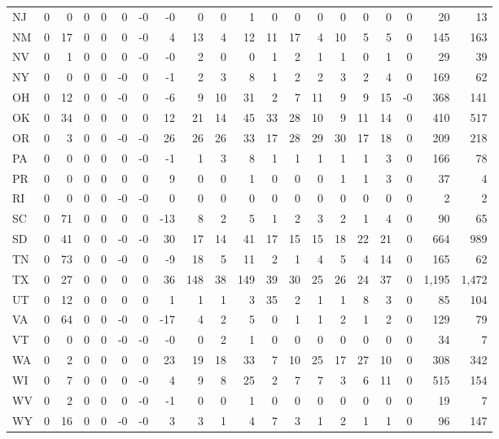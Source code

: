 \begin{longtable}{lrrrrrrrrrrrrrrrrrrr}
NJ & 0 & 0 & 0 & 0 & 0 & -0 & -0 & 0 & 0 & 1 & 0 & 0 & 0 & 0 & 0 & 0 & 0 & 20 & 13 \\
NM & 0 & 17 & 0 & 0 & 0 & -0 & 4 & 13 & 4 & 12 & 11 & 17 & 4 & 10 & 5 & 5 & 0 & 145 & 163 \\
NV & 0 & 1 & 0 & 0 & 0 & -0 & -0 & 2 & 0 & 0 & 1 & 2 & 1 & 1 & 0 & 1 & 0 & 29 & 39 \\
NY & 0 & 0 & 0 & 0 & -0 & 0 & -1 & 2 & 3 & 8 & 1 & 2 & 2 & 3 & 2 & 4 & 0 & 169 & 62 \\
OH & 0 & 12 & 0 & 0 & -0 & 0 & -6 & 9 & 10 & 31 & 2 & 7 & 11 & 9 & 9 & 15 & -0 & 368 & 141 \\
OK & 0 & 34 & 0 & 0 & 0 & 0 & 12 & 21 & 14 & 45 & 33 & 28 & 10 & 9 & 11 & 14 & 0 & 410 & 517 \\
OR & 0 & 3 & 0 & 0 & -0 & -0 & 26 & 26 & 26 & 33 & 17 & 28 & 29 & 30 & 17 & 18 & 0 & 209 & 218 \\
PA & 0 & 0 & 0 & 0 & 0 & -0 & -1 & 1 & 3 & 8 & 1 & 1 & 1 & 1 & 1 & 3 & 0 & 166 & 78 \\
PR & 0 & 0 & 0 & 0 & 0 & 0 & 9 & 0 & 0 & 1 & 0 & 0 & 0 & 1 & 1 & 3 & 0 & 37 & 4 \\
RI & 0 & 0 & 0 & 0 & -0 & -0 & 0 & 0 & 0 & 0 & 0 & 0 & 0 & 0 & 0 & 0 & 0 & 2 & 2 \\
SC & 0 & 71 & 0 & 0 & 0 & 0 & -13 & 8 & 2 & 5 & 1 & 2 & 3 & 2 & 1 & 4 & 0 & 90 & 65 \\
SD & 0 & 41 & 0 & 0 & -0 & -0 & 30 & 17 & 14 & 41 & 17 & 15 & 15 & 18 & 22 & 21 & 0 & 664 & 989 \\
TN & 0 & 73 & 0 & 0 & -0 & 0 & -9 & 18 & 5 & 11 & 2 & 1 & 4 & 5 & 4 & 14 & 0 & 165 & 62 \\
TX & 0 & 27 & 0 & 0 & 0 & 0 & 36 & 148 & 38 & 149 & 39 & 30 & 25 & 26 & 24 & 37 & 0 & 1,195 & 1,472 \\
UT & 0 & 12 & 0 & 0 & 0 & 0 & 1 & 1 & 1 & 3 & 35 & 2 & 1 & 1 & 8 & 3 & 0 & 85 & 104 \\
VA & 0 & 64 & 0 & 0 & -0 & 0 & -17 & 4 & 2 & 5 & 0 & 1 & 1 & 2 & 1 & 2 & 0 & 129 & 79 \\
VT & 0 & 0 & 0 & 0 & -0 & -0 & -0 & 0 & 2 & 1 & 0 & 0 & 0 & 0 & 0 & 0 & 0 & 34 & 7 \\
WA & 0 & 2 & 0 & 0 & 0 & 0 & 23 & 19 & 18 & 33 & 7 & 10 & 25 & 17 & 27 & 10 & 0 & 308 & 342 \\
WI & 0 & 7 & 0 & 0 & 0 & -0 & 4 & 9 & 8 & 25 & 2 & 7 & 7 & 3 & 6 & 11 & 0 & 515 & 154 \\
WV & 0 & 2 & 0 & 0 & 0 & -0 & -1 & 0 & 0 & 1 & 0 & 0 & 0 & 0 & 0 & 0 & 0 & 19 & 7 \\
WY & 0 & 16 & 0 & 0 & -0 & -0 & 3 & 3 & 1 & 4 & 7 & 3 & 1 & 2 & 1 & 1 & 0 & 96 & 147 \\
\end{longtable}
